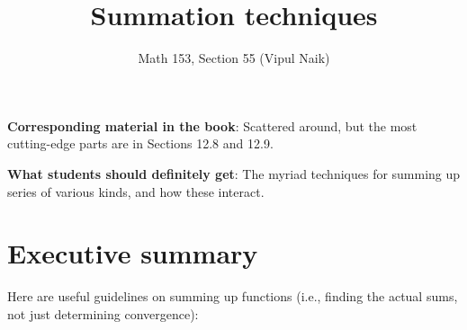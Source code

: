 \documentclass{amsart}
\title{Summation techniques}
\author{Math 153, Section 55 (Vipul Naik)}
\begin{document}
\maketitle

{\bf Corresponding material in the book}: Scattered around, but the
most cutting-edge parts are in Sections 12.8 and 12.9.

{\bf What students should definitely get}: The myriad techniques for
summing up series of various kinds, and how these interact.

\section*{Executive summary}

Here are useful guidelines on summing up functions (i.e., finding
the actual sums, not just determining convergence):
\end{document}

